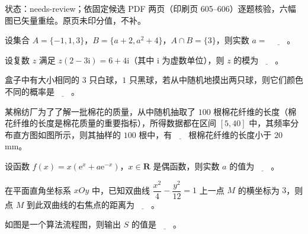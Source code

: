 

状态：needs-review；依固定候选 PDF 两页（印刷页 605–606）逐题核验，六幅图已矢量重绘。原页未印分值，不补。


\begin{question}
设集合 $A=\{-1,1,3\}$，$B=\{a+2,a^2+4\}$，$A\cap B=\{3\}$，则实数 $a=$ $\underline{\qquad}$。

\end{question}
\begin{question}
设复数 $z$ 满足 $z(2-3\mathrm i)=6+4\mathrm i$（其中 $\mathrm i$ 为虚数单位），则 $z$ 的模为$\underline{\qquad}$。

\end{question}
\begin{question}
盒子中有大小相同的 $3$ 只白球，$1$ 只黑球，若从中随机地摸出两只球，则它们颜色不同的概率是$\underline{\qquad}$。

\Needspace{0.4\textheight}
\end{question}
\begingroup
\renewenvironment{question}{\Needspace{0.5\textheight}}{}
\begin{question}
某棉纺厂为了了解一批棉花的质量，从中随机抽取了 $100$ 根棉花纤维的长度（棉花纤维的长度是棉花质量的重要指标），所得数据都在区间 $[5,40]$ 中，其频率分布直方图如图所示，则其抽样的 $100$ 根中，有$\underline{\qquad}$根棉花纤维的长度小于 $20$ mm。
\nopagebreak[4]
\begin{center}\end{center}
\nopagebreak[4]
\end{question}
\endgroup
\begin{question}
设函数 $f(x)=x(\mathrm e^x+a\mathrm e^{-x})$，$x\in\mathbf R$ 是偶函数，则实数 $a$ 的值为$\underline{\qquad}$。

\end{question}
\begin{question}
在平面直角坐标系 $xOy$ 中，已知双曲线 $\dfrac{x^2}{4}-\dfrac{y^2}{12}=1$ 上一点 $M$ 的横坐标为 $3$，则点 $M$ 到此双曲线的右焦点的距离为$\underline{\qquad}$。

\Needspace{0.4\textheight}
\end{question}
\begingroup
\renewenvironment{question}{\Needspace{0.5\textheight}}{}
\begin{question}
如图是一个算法流程图，则输出 $S$ 的值是$\underline{\qquad}$。
\nopagebreak[4]
\begin{center}\end{center}
\nopagebreak[4]
\end{question}
